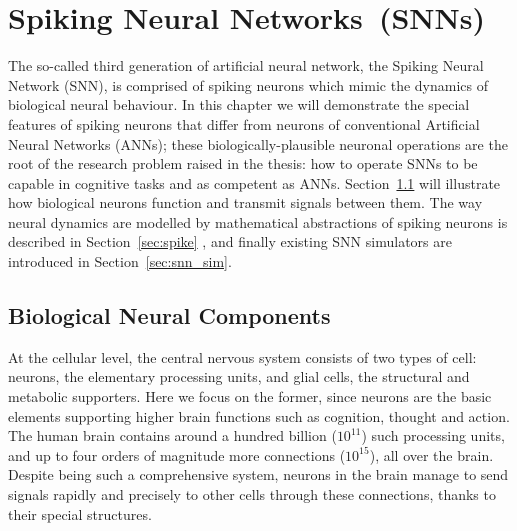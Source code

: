 \chapter{Spiking Neural Networks~(SNNs)}
\label{cha:bkg}
The so-called third generation of artificial neural network, the Spiking Neural Network (SNN), is comprised of spiking neurons which mimic the dynamics of biological neural behaviour.
In this chapter we will demonstrate the special features of spiking neurons that differ from neurons of conventional Artificial Neural Networks (ANNs);
these biologically-plausible neuronal operations are the root of the research problem raised in the thesis: how to operate SNNs to be capable in cognitive tasks and as competent as ANNs.
Section~\ref{sec:bio_neuron} will illustrate how biological neurons function and transmit signals between them.
The way neural dynamics are modelled by mathematical abstractions of spiking neurons is described in Section~\ref{sec:spike} , and finally existing SNN simulators are introduced in Section~\ref{sec:snn_sim}.

\section{Biological Neural Components}
\label{sec:bio_neuron}
At the cellular level, the central nervous system consists of two types of cell: neurons, the elementary processing units, and glial cells, the structural and metabolic supporters. 
Here we focus on the former, since neurons are the basic elements supporting higher brain functions such as cognition, thought and action. %
The human brain contains around a hundred billion ($10^{11}$) such processing units, and up to four orders of magnitude more connections ($10^{15}$), all over the brain.
Despite being such a comprehensive system, neurons in the brain manage to send signals rapidly and precisely to other cells through these connections, thanks to their special structures.
